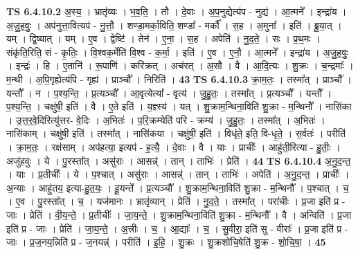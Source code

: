 \documentclass[17pt]{extarticle}
\begin{document}
                  \newline
                                \textbf{ TS 6.4.10.2} \newline
                  अ॒स्य॒ । भ्रातृ॑व्यः । भ॒व॒ति॒ । तौ । दे॒वाः । अ॒प॒नुद्येत्य॑प - नुद्य॑ । आ॒त्मने᳚ । इन्द्रा॑य । अ॒जु॒ह॒वुः॒ । अप॑नुत्ता॒वित्यप॑ - नु॒त्तौ॒ । शण्डा॒मर्का॒विति॒ शण्डा᳚ - मर्कौ᳚ । स॒ह । अ॒मुना᳚ । इति॑ । ब्रू॒या॒त् । यम् । द्वि॒ष्यात् । यम् । ए॒व । द्वेष्टि॑ । तेन॑ । ए॒ना॒ । स॒ह । अपेति॑ । नु॒द॒ते॒ । सः । प्र॒थ॒मः । संकृ॑ति॒रिति॒ सं - कृ॒तिः॒ । वि॒श्वक॒र्मेति॑ वि॒श्व - क॒र्मा॒ । इति॑ । ए॒व । ए॒नौ॒ । आ॒त्मने᳚ । इन्द्रा॑य । अ॒जु॒ह॒वुः॒ । इन्द्रः॑ । हि । ए॒तानि॑ । रू॒पाणि॑ । करि॑क्रत् । अच॑रत् । अ॒सौ । वै । आ॒दि॒त्यः । शु॒क्रः । च॒न्द्रमाः᳚ । म॒न्थी । अ॒पि॒गृह्येत्य॑पि - गृह्य॑ । प्राञ्चौ᳚ । निरिति॑ । \textbf{  43} \newline
                  \newline
                                \textbf{ TS 6.4.10.3} \newline
                  क्रा॒म॒तः॒ । तस्मा᳚त् । प्राञ्चौ᳚ । यन्तौ᳚ । न । प॒श्य॒न्ति॒ । प्र॒त्यञ्चौ᳚ । आ॒वृत्येत्या᳚ - वृत्य॑ । जु॒हु॒तः॒ । तस्मा᳚त् । प्र॒त्यञ्चौ᳚ । यन्तौ᳚ । प॒श्य॒न्ति॒ । चक्षु॑षी॒ इति॑ । वै । ए॒ते इति॑ । य॒ज्ञ्स्य॑ । यत् । शु॒क्राम॒न्थिना॒विति॑ शु॒क्रा - म॒न्थिनौ᳚ । नासि॑का । उ॒त्त॒र॒वे॒दिरित्यु॑त्तर- वे॒दिः । अ॒भितः॑ । प॒रि॒क्रम्येति॑ परि - क्रम्य॑ । जु॒हु॒तः॒ । तस्मा᳚त् । अ॒भितः॑ । नासि॑काम् । चक्षु॑षी॒ इति॑ । तस्मा᳚त् । नासि॑कया । चक्षु॑षी॒ इति॑ । विधृ॑ते॒ इति॒ वि-धृ॒ते॒ । स॒र्वतः॑ । परीति॑ । क्रा॒म॒तः॒ । रक्ष॑साम् । अप॑हत्या॒ इत्यप॑ - ह॒त्यै॒ । दे॒वाः । वै । याः । प्राचीः᳚ । आहु॑ती॒रित्या - हु॒तीः॒ । अजु॑हवुः । ये । पु॒रस्ता᳚त् । असु॑राः । आसन्न्॑ । तान् । ताभिः॑ । प्रेति॑ । \textbf{  44} \newline
                  \newline
                                \textbf{ TS 6.4.10.4} \newline
                  अ॒नु॒द॒न्त॒ । याः । प्र॒तीचीः᳚ । ये । प॒श्चात् । असु॑राः । आसन्न्॑ । तान् । ताभिः॑ । अपेति॑ । अ॒नु॒द॒न्त॒ । प्राचीः᳚ । अ॒न्याः । आहु॑तय॒ इत्या-हु॒त॒यः॒ । हू॒यन्ते᳚ । प्र॒त्यञ्चौ᳚ । शु॒क्राम॒न्थिना॒विति॑ शु॒क्रा - म॒न्थिनौ᳚ । प॒श्चात् । च॒ । ए॒व । पु॒रस्ता᳚त् । च॒ । यज॑मानः । भ्रातृ॑व्यान् । प्रेति॑ । नु॒द॒ते॒ । तस्मा᳚त् । परा॑चीः । प्र॒जा इति॑ प्र - जाः । प्रेति॑ । वी॒य॒न्ते॒ । प्र॒तीचीः᳚ । जा॒य॒न्ते॒ । शु॒क्राम॒न्थिना॒विति॑ शु॒क्रा - म॒न्थिनौ᳚ । वै । अन्विति॑ । प्र॒जा इति॑ प्र - जाः । प्रेति॑ । जा॒य॒न्ते॒ । अ॒त्त्रीः । च॒ । आ॒द्याः᳚ । च॒ । सु॒वीरा॒ इति॑ सु - वीराः᳚ । प्र॒जा इति॑ प्र - जाः । प्र॒ज॒नय॒न्निति॑ प्र - ज॒नयन्न्॑ । परीति॑ । इ॒हि॒ । शु॒क्रः । शु॒क्रशो॑चि॒षेति॑ शु॒क्र - शो॒चि॒षा॒ । \textbf{  45} \newline
\end{document}
